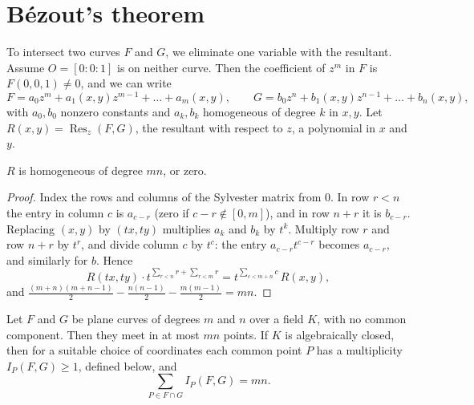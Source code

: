 \section{B\'ezout's theorem}

To intersect two curves $F$ and $G$, we eliminate one variable with the resultant. Assume $O=[0:0:1]$ is on neither curve. Then the coefficient of
$z^m$ in $F$ is $F(0,0,1)\ne0$, and we can write
\[
F=a_0z^m+a_1(x,y)z^{m-1}+\dots+a_m(x,y),\qquad G=b_0z^n+b_1(x,y)z^{n-1}+\dots+b_n(x,y),
\]
with $a_0,b_0$ nonzero constants and $a_k,b_k$ homogeneous of degree $k$ in $x,y$. Let $R(x,y)=\operatorname{Res}_z(F,G)$, the resultant with
respect to $z$, a polynomial in $x$ and $y$.

\begin{lemma}\label{lem:reshomog}
$R$ is homogeneous of degree $mn$, or zero.
\end{lemma}

\begin{proof}
Index the rows and columns of the Sylvester matrix from $0$. In row $r<n$ the entry in column $c$ is $a_{c-r}$ (zero if $c-r\notin[0,m]$), and in row
$n+r$ it is $b_{c-r}$. Replacing $(x,y)$ by $(tx,ty)$ multiplies $a_k$ and $b_k$ by $t^k$. Multiply row $r$ and row $n+r$ by $t^r$, and divide column $c$
by $t^c$: the entry $a_{c-r}t^{c-r}$ becomes $a_{c-r}$, and similarly for $b$. Hence
\[
R(tx,ty)\cdot t^{\sum_{r<n}r+\sum_{r<m}r}=t^{\sum_{c<m+n}c}\,R(x,y),
\]
and $\frac{(m+n)(m+n-1)}2-\frac{n(n-1)}2-\frac{m(m-1)}2=mn$.
\end{proof}

\begin{theorem}[B\'ezout]\label{thm:bezout}
Let $F$ and $G$ be plane curves of degrees $m$ and $n$ over a field $K$, with no common component. Then they meet in at most $mn$ points.
If $K$ is algebraically closed, then for a suitable choice of coordinates each common point $P$ has a multiplicity $I_P(F,G)\ge1$, defined below, and
\[
\sum_{P\in F\cap G}I_P(F,G)=mn.
\]
\end{theorem}

